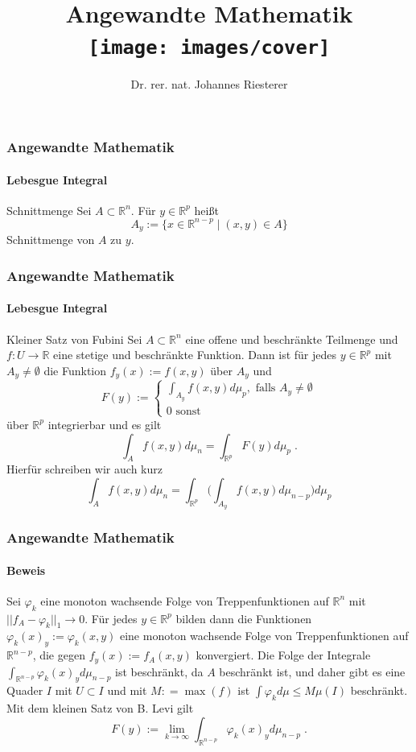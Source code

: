 \documentclass{beamer}
\begin{document}
\title[Angewandte Mathematik] %
{Angewandte Mathematik
\\
\texttt{[image: images/cover]}
}
\subtitle{}
\author[Dr. Johannes Riesterer] %
{Dr.  rer. nat. Johannes Riesterer}

\date[KPT 2004] %
{}

\subject{Angewandte Mathematik}



\frame{\titlepage}



\begin{frame}
    \frametitle{Angewandte Mathematik}
\framesubtitle{Lebesgue Integral}
\begin{block}{Schnittmenge}
Sei $ A \subset \mathbb{R}^n$. Für $ y \in \mathbb{R}^p$ heißt
$$ A_y :=  \biggl \{    x \in \mathbb{R}^{n-p}  \; | \;  (x,y) \in A \biggr \}$$  
Schnittmenge von $A$ zu $y$.
\end{block}
 \end{frame}



\begin{frame}
    \frametitle{Angewandte Mathematik}
\framesubtitle{Lebesgue Integral}
\begin{block}{Kleiner Satz von Fubini}
Sei $A \subset \mathbb{R}^n$ eine offene und beschränkte Teilmenge und $f : U \to \mathbb{R}$  eine stetige und beschränkte Funktion.
Dann ist für jedes $ y \in \mathbb{R}^p$ mit $A_y \neq \emptyset$ die Funktion $f_y(x) := f(x,y)$ über $A_y$ und   
$$ F(y) := \begin{cases}   \int_{A_y} f(x,y) d \mu_{p}  , \text{ falls }  A_y \neq \emptyset 
\\ 0 \text{ sonst } \end{cases} $$
über $\mathbb{R}^{p}$ integrierbar und es gilt 
$$ \int_A f(x,y) d \mu_n = \int_{\mathbb{R}^p } F(y) d \mu_p \; .$$
 Hierfür schreiben wir auch kurz
$$ \int_A f(x,y) d \mu_n  = \int_{\mathbb{R}^{p} }  \biggl ( \int_{A_y} f(x,y)  d\mu_{n-p} \biggr ) d\mu_p$$
\end{block}
 \end{frame}



\begin{frame}
    \frametitle{Angewandte Mathematik}
\framesubtitle{Beweis}
Sei  $\varphi_k$ eine monoton wachsende Folge von Treppenfunktionen auf $\mathbb{R}^n$ mit $|| f_A - \varphi_k ||_1 \to 0$.
Für jedes $y \in \mathbb{R}^p$ bilden dann die Funktionen $\varphi_k(x)_y := \varphi_k(x,y)$ eine monoton wachsende Folge von Treppenfunktionen auf $\mathbb{R}^{n-p}$, die gegen $f_y(x):= f_A(x,y)$ konvergiert. Die Folge der Integrale $\int_{\mathbb{R}^{n-p}} \varphi_k(x)_y d \mu_{n-p}$ ist beschränkt,  da $A$ beschränkt ist, und daher gibt es eine Quader $I$ mit $U \subset I$ und  mit $M : = \max (f)$  ist $\int \varphi_k d \mu \leq M \mu(I)$ beschränkt. Mit dem kleinen Satz von B. Levi
gilt
$$ F(y) := \lim_{k \to \infty} \int_{\mathbb{R}^{n-p}} \varphi_k(x)_y d \mu_{n-p} \; .$$
 \end{frame}
\end{document}
